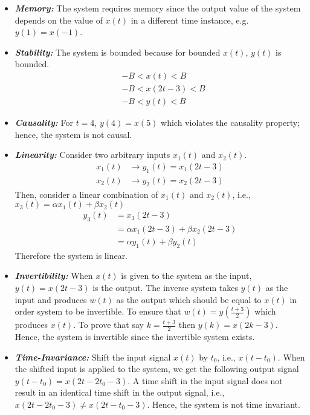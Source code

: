 \documentclass[10pt,a4paper, margin=1in]{article}
\begin{document}
\begin{enumerate}
\begin{enumerate}
	\begin{itemize}
		\item \textbf{\textit{Memory:}} The system requires memory since the output value of the system depends on the value of $x(t)$ in a different time instance, e.g. $y(1) = x(-1)$.
		\item \textbf{\textit{Stability:}} The system is bounded because for bounded $x(t)$, $y(t)$ is bounded.
		\begin{equation}
		\begin{split}
			& -B < x(t) < B \\
			& -B < x(2t-3) < B \\
			& -B < y(t) < B 
		\end{split}
		\end{equation}
		\item \textbf{\textit{Causality:}} For $t = 4$, $y(4) = x(5)$ which violates the causality property; hence, the system is not causal.
		\item \textbf{\textit{Linearity:}} Consider two arbitrary inputs $x_1(t)$ and $x_2(t)$.
		\begin{equation}
		\begin{split}
			x_1(t) & \rightarrow y_1(t) = x_1(2t-3)\\
			x_2(t) & \rightarrow y_2(t) = x_2(2t-3)
		\end{split}
		\end{equation}
		Then, consider a linear combination of $x_1(t)$ and $x_2(t)$, i.e., $x_3(t)=\alpha x_1(t) + \beta x_2(t)$
		\begin{equation}
		\begin{split}
			y_3(t) & = x_3(2t - 3)\\
			& = \alpha x_1(2t-3) + \beta x_2(2t-3)\\
			& = \alpha y_1(t) + \beta y_2(t)
		\end{split}
		\end{equation}
		Therefore the system is linear.
		\item \textbf{\textit{Invertibility:}} When $x(t)$ is given to the system as the input, $y(t) = x(2t - 3)$ is the output. The inverse system takes $y(t)$ as the input and produces $w(t)$ as the output which should be equal to $x(t)$ in order system to be invertible. To ensure that $w(t)=y(\frac{t+3}{2})$ which produces $x(t)$. To prove that say $k=\frac{t+3}{2}$ then $y(k)=x(2k-3)$. Hence, the system is invertible since the invertible system exists.

		\item \textbf{\textit{Time-Invariance:}} Shift the input signal $x(t)$ by $t_0$, i.e., $x(t-t_0)$. When the shifted input is applied to the system, we get the following output signal $y(t-t_0)  = x(2t-2t_0-3)$. A time shift in the input signal does not result in an identical time shift in the output signal, i.e., $x(2t-2t_0-3) \neq x(2t - t_0 - 3)$. Hence, the system is not time invariant.
	\end{itemize}
    

\end{enumerate}
\end{enumerate}
\end{document}

